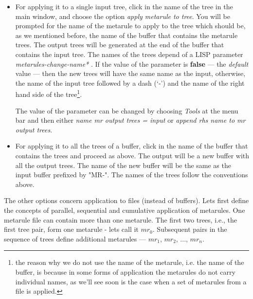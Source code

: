 \begin{itemize}
\item   For applying it to a single input tree, click in the name of the
        tree in the main window, and choose the option 
        {\it apply metarule to tree}. 
        You will be prompted for the name of the metarule
        to apply to the tree
        which should be, as we mentioned before, the name of the buffer that
        contains the metarule trees. The output trees will be generated
        at the end of the buffer that contains the input tree. The names of
        the trees depend of a LISP parameter {\it *metarules-change-name* }.
        If the value of the parameter is {\bf false} --- the {\it default} 
        value --- then the new trees will have the same name as the input, 
        otherwise, the name of the input tree followed by a dash (`-') and
        the name of the right hand side of the tree\footnote{the reason why 
        we do not use the name of the metarule, i.e. the name of the buffer,
        is because in some forms of application the metarules do not
        carry individual names, as we'll see soon is the case when a set of
        metarules from a file is applied.}.

        The value of the parameter can be changed by choosing {\it Tools} 
        at the menu bar and then either {\it name mr output trees =
        input}  or {\it append rhs name to mr output trees}.

        
\item   For applying it to all the trees of a buffer, click in the name of the 
        buffer that contains the trees and proceed as above. The output will
        be a new buffer with all the output trees. The name of the new buffer
        will be the same as the input buffer prefixed by "MR-". The names of
        the trees follow the conventions above.

\end{itemize}

The other options concern application to files (instead of buffers). 
Lets first define
the concepts of parallel, sequential and cumulative application of metarules. 
One metarule 
file can contain more than one metarule. The first two trees, i.e., the first
tree pair, form one metarule - lets call it $mr_0$. Subsequent pairs in the
sequence of trees define additional metarules --- 
$mr_1$, $mr_2$, ..., $mr_n$.


